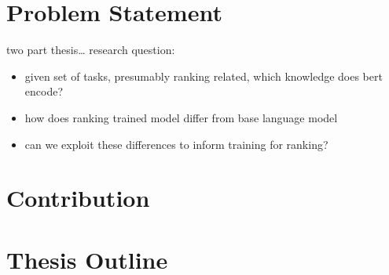 \section{Problem Statement}
two part thesis\dots
research question:
\begin{itemize}
    \item given set of tasks, presumably ranking related, which knowledge does bert encode?
    \item how does ranking trained model differ from base language model
    \item can we exploit these differences to inform training for ranking?
\end{itemize}
\section{Contribution}

\section{Thesis Outline}
